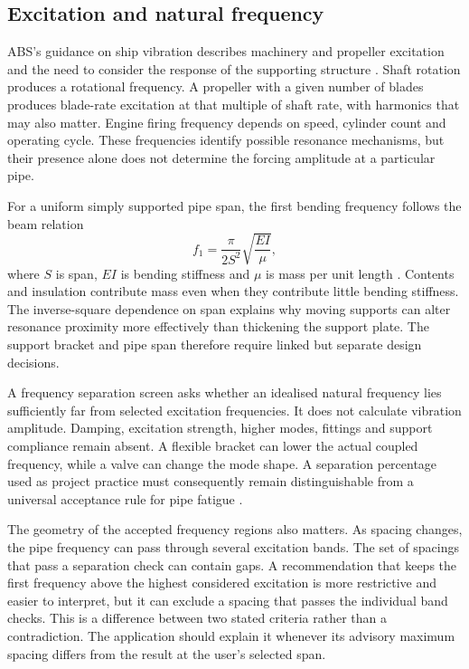 \subsection{Excitation and natural frequency}
\label{sec:lit-pipe-dynamics}

ABS's guidance on ship vibration describes machinery and propeller excitation and the need to consider the response of the supporting structure \cite{absVibration2023}. Shaft rotation produces a rotational frequency. A propeller with a given number of blades produces blade-rate excitation at that multiple of shaft rate, with harmonics that may also matter. Engine firing frequency depends on speed, cylinder count and operating cycle. These frequencies identify possible resonance mechanisms, but their presence alone does not determine the forcing amplitude at a particular pipe.

For a uniform simply supported pipe span, the first bending frequency follows the beam relation
\begin{equation}
f_1=\frac{\pi}{2S^2}\sqrt{\frac{EI}{\mu}},
\label{eq:lit-pipe-frequency}
\end{equation}
where $S$ is span, $EI$ is bending stiffness and $\mu$ is mass per unit length \cite{blevins1979}. Contents and insulation contribute mass even when they contribute little bending stiffness. The inverse-square dependence on span explains why moving supports can alter resonance proximity more effectively than thickening the support plate. The support bracket and pipe span therefore require linked but separate design decisions.

A frequency separation screen asks whether an idealised natural frequency lies sufficiently far from selected excitation frequencies. It does not calculate vibration amplitude. Damping, excitation strength, higher modes, fittings and support compliance remain absent. A flexible bracket can lower the actual coupled frequency, while a valve can change the mode shape. A separation percentage used as project practice must consequently remain distinguishable from a universal acceptance rule for pipe fatigue \cite{absVibration2023,nasa7009}.

The geometry of the accepted frequency regions also matters. As spacing changes, the pipe frequency can pass through several excitation bands. The set of spacings that pass a separation check can contain gaps. A recommendation that keeps the first frequency above the highest considered excitation is more restrictive and easier to interpret, but it can exclude a spacing that passes the individual band checks. This is a difference between two stated criteria rather than a contradiction. The application should explain it whenever its advisory maximum spacing differs from the result at the user's selected span.

